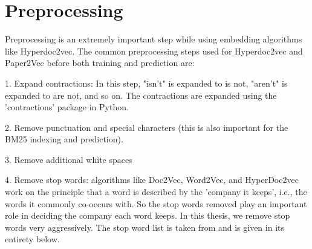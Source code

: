 \chapter{Preprocessing}\label{chap:preprocessing}

Preprocessing is an extremely important step while using embedding algorithms like Hyperdoc2vec. The common preprocessing steps used for Hyperdoc2vec and Paper2Vec before both training and prediction are:

1. Expand contractions: In this step, "isn't" is expanded to is not, "aren't" is expanded to are not, and so on. The contractions are expanded using the 'contractions' package in Python.

2. Remove punctuation and special characters (this is also important for the BM25 indexing and prediction).

3. Remove additional white spaces

4. Remove stop words: algorithms like Doc2Vec, Word2Vec, and HyperDoc2vec work on the principle that a word is described by the 'company it keeps', i.e., the words it commonly co-occurs with. 
So the stop words removed play an important role in deciding the company each word keeps.
In this thesis, we remove stop words very aggressively. The stop word list is taken from \cite{StoneDK11} and is given in its entirety below.

